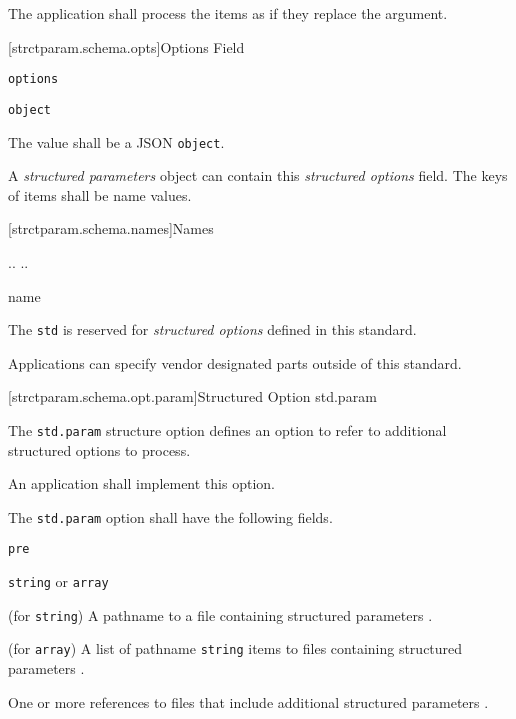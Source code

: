 The application shall process the items as if they replace the
 argument.

[strctparam.schema.opts]{Options Field}

\begin{itemdescr}

	\pnum \fldname \verb|options|

	\pnum \fldtype \verb|object|

	\pnum \fldval
	The value shall be a JSON \verb|object|.

	\pnum \flddesc
	A \emph{structured parameters} object can contain this \emph{structured
	options} field.  The keys of items shall be name 
	 values.

\end{itemdescr}

[strctparam.schema.names]{Names}

\pnum
\begin{ncbnf}

\br
	\br
	 ..  \br
	 ..  \br
	   

\br
	name 

\br
	 

\end{ncbnf}

\pnum
The  \verb|std| is reserved for \emph{structured options}
defined in this standard.

\pnum
Applications can specify vendor designated  parts outside of
this standard.

[strctparam.schema.opt.param]{Structured Option std.param}

\pnum
The \verb|std.param| structure option defines an option to refer to additional
structured options  to process.

\pnum
An application shall implement this option.

\pnum
The \verb|std.param| option shall have the following fields.

\vspace{\baselineskip}

\begin{itemdescr}

	\pnum \fldname \verb|pre|

	\pnum \fldtype \verb|string| or \verb|array|

	\pnum \fldval (for \verb|string|) A pathname to a file containing 
	structured parameters .

	\pnum \fldval (for \verb|array|) A list of pathname \verb|string| items to 
	files containing structured parameters .

	\pnum \flddesc
	One or more references to files that include additional structured 
	parameters .

\end{itemdescr}

